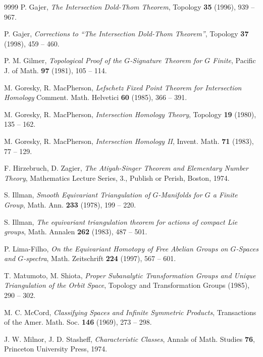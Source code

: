 \documentclass{amsart}
\theoremstyle{definition}
\theoremstyle{remark}
\begin{document}
\begin{thebibliography}{9999}
 P. Gajer,
 {\em The Intersection Dold-Thom Theorem},
 Topology \textbf{35} (1996), 939 -- 967.
 
 P. Gajer,
 {\em Corrections to ``The Intersection Dold-Thom Theorem''},
 Topology \textbf{37} (1998), 459 -- 460.
 
 P. M. Gilmer,
  {\em Topological Proof of the $G$-Signature Theorem for $G$ Finite},
  Pacific J. of Math. \textbf{97} (1981), 105 -- 114.
    
 M. Goresky, R. MacPherson,   
 {\em Lefschetz Fixed Point Theorem for Intersection Homology}
 Comment. Math. Helvetici \textbf{60} (1985), 366 -- 391.  
      
 M. Goresky, R. MacPherson,
 {\em Intersection Homology Theory},
 Topology \textbf{19} (1980), 135 -- 162.    
   
 M. Goresky, R. MacPherson,
 {\em Intersection Homology II},
 Invent. Math. \textbf{71} (1983), 77 -- 129.  
 
 F. Hirzebruch, D. Zagier,
 {\em The Atiyah-Singer Theorem and Elementary Number Theory},
 Mathematics Lecture Series, 3., Publish or Perish, Boston, 1974.
       
 S. Illman,
 {\em Smooth Equivariant Triangulation of $G$-Manifolds for $G$ a 
   Finite Group},
 Math. Ann. \textbf{233} (1978), 199 -- 220.         
       
 S. Illman,
 {\em The equivariant triangulation theorem for actions of compact Lie groups},
 Math. Annalen \textbf{262} (1983), 487 -- 501. 
                 
 P. Lima-Filho,
 {\em On the Equivariant Homotopy of Free Abelian Groups
  on $G$-Spaces and $G$-spectra},
  Math. Zeitschrift \textbf{224} (1997), 567 -- 601.   
         
 T. Matumoto, M. Shiota,
 {\em Proper Subanalytic Transformation Groups and Unique Triangulation
    of the Orbit Space}, 
  Topology and Transformation Groups (1985), 290 -- 302.
      
 M. C. McCord,
 {\em Classifying Spaces and Infinite Symmetric Products},
 Transactions of the Amer. Math. Soc. \textbf{146} (1969), 273 -- 298.    
       
 J. W. Milnor, J. D. Stasheff,
 {\em Characteristic Classes},
 Annals of Math. Studies \textbf{76}, Princeton University Press, 1974.  
  

\end{thebibliography}
\end{document}
